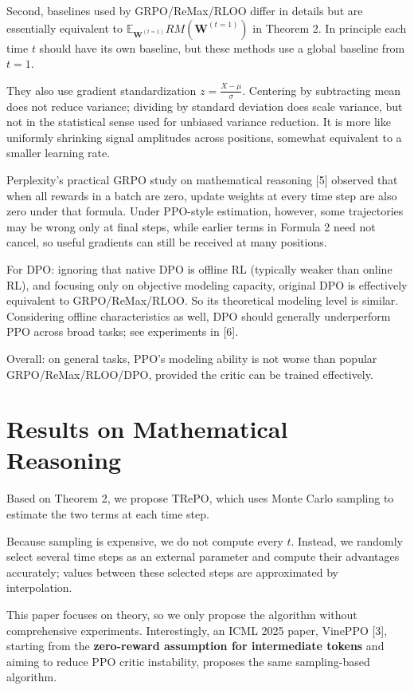 \documentclass[11pt,english]{ctexart}
\newcommand{\Exp}{\mathbb{E}}
\newcommand{\Path}{\mathbf{W}}
\newcommand{\RM}{RM}
\begin{document}
Second, baselines used by GRPO/ReMax/RLOO differ in details but are essentially equivalent to $\Exp_{\Path^{(t=1)}}\RM(\Path^{(t=1)})$ in Theorem 2. In principle each time $t$ should have its own baseline, but these methods use a global baseline from $t=1$.

They also use gradient standardization $z=\frac{X-\mu}{\sigma}$. Centering by subtracting mean does not reduce variance; dividing by standard deviation does scale variance, but not in the statistical sense used for unbiased variance reduction. It is more like uniformly shrinking signal amplitudes across positions, somewhat equivalent to a smaller learning rate.

Perplexity's practical GRPO study on mathematical reasoning [5] observed that when all rewards in a batch are zero, update weights at every time step are also zero under that formula. Under PPO-style estimation, however, some trajectories may be wrong only at final steps, while earlier terms in Formula 2 need not cancel, so useful gradients can still be received at many positions.

For DPO: ignoring that native DPO is offline RL (typically weaker than online RL), and focusing only on objective modeling capacity, original DPO is effectively equivalent to GRPO/ReMax/RLOO. So its theoretical modeling level is similar. Considering offline characteristics as well, DPO should generally underperform PPO across broad tasks; see experiments in [6].

Overall: on general tasks, PPO's modeling ability is not worse than popular GRPO/ReMax/RLOO/DPO, provided the critic can be trained effectively.

\section{Results on Mathematical Reasoning}

Based on Theorem 2, we propose TRePO, which uses Monte Carlo sampling to estimate the two terms at each time step.

Because sampling is expensive, we do not compute every $t$. Instead, we randomly select several time steps as an external parameter and compute their advantages accurately; values between these selected steps are approximated by interpolation.

This paper focuses on theory, so we only propose the algorithm without comprehensive experiments. Interestingly, an ICML 2025 paper, VinePPO [3], starting from the \textbf{zero-reward assumption for intermediate tokens} and aiming to reduce PPO critic instability, proposes the same sampling-based algorithm.
\end{document}
